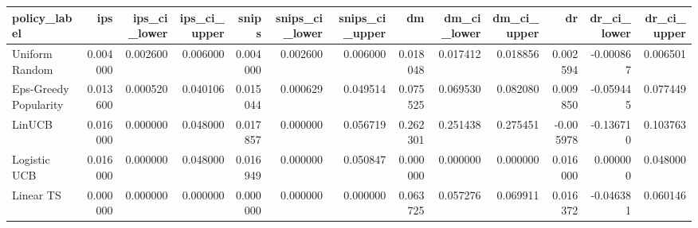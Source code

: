 \begin{tabular}{lrrrrrrrrrrrr}
\toprule
policy\_label & ips & ips\_ci\_lower & ips\_ci\_upper & snips & snips\_ci\_lower & snips\_ci\_upper & dm & dm\_ci\_lower & dm\_ci\_upper & dr & dr\_ci\_lower & dr\_ci\_upper \\
\midrule
Uniform Random & 0.004000 & 0.002600 & 0.006000 & 0.004000 & 0.002600 & 0.006000 & 0.018048 & 0.017412 & 0.018856 & 0.002594 & -0.000867 & 0.006501 \\
Eps-Greedy Popularity & 0.013600 & 0.000520 & 0.040106 & 0.015044 & 0.000629 & 0.049514 & 0.075525 & 0.069530 & 0.082080 & 0.009850 & -0.059445 & 0.077449 \\
LinUCB & 0.016000 & 0.000000 & 0.048000 & 0.017857 & 0.000000 & 0.056719 & 0.262301 & 0.251438 & 0.275451 & -0.005978 & -0.136710 & 0.103763 \\
Logistic UCB & 0.016000 & 0.000000 & 0.048000 & 0.016949 & 0.000000 & 0.050847 & 0.000000 & 0.000000 & 0.000000 & 0.016000 & 0.000000 & 0.048000 \\
Linear TS & 0.000000 & 0.000000 & 0.000000 & 0.000000 & 0.000000 & 0.000000 & 0.063725 & 0.057276 & 0.069911 & 0.016372 & -0.046381 & 0.060146 \\
\bottomrule
\end{tabular}
